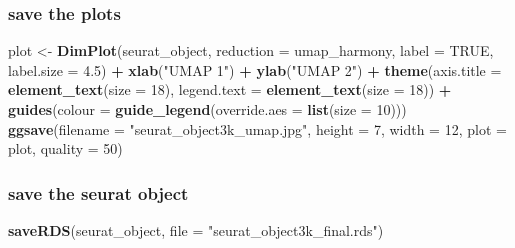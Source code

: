 \documentclass[
]{book}
\newenvironment{Shaded}{\begin{snugshade}}{\end{snugshade}}
\newcommand{\AttributeTok}[1]{\textcolor[rgb]{0.13,0.29,0.53}{#1}}
\newcommand{\ConstantTok}[1]{\textcolor[rgb]{0.56,0.35,0.01}{#1}}
\newcommand{\DecValTok}[1]{\textcolor[rgb]{0.00,0.00,0.81}{#1}}
\newcommand{\FloatTok}[1]{\textcolor[rgb]{0.00,0.00,0.81}{#1}}
\newcommand{\FunctionTok}[1]{\textcolor[rgb]{0.13,0.29,0.53}{\textbf{#1}}}
\newcommand{\NormalTok}[1]{#1}
\newcommand{\OtherTok}[1]{\textcolor[rgb]{0.56,0.35,0.01}{#1}}
\newcommand{\SpecialCharTok}[1]{\textcolor[rgb]{0.81,0.36,0.00}{\textbf{#1}}}
\newcommand{\StringTok}[1]{\textcolor[rgb]{0.31,0.60,0.02}{#1}}
\begin{document}
\subsubsection*{}\label{section-13}

\subsubsection{save the plots}\label{save-the-plots}

\begin{Shaded}
\begin{Highlighting}[]

\NormalTok{plot }\OtherTok{\textless{}{-}} \FunctionTok{DimPlot}\NormalTok{(seurat\_object, }\AttributeTok{reduction =} \StringTok{\textquotesingle{}umap\_harmony\textquotesingle{}}\NormalTok{, }\AttributeTok{label =} \ConstantTok{TRUE}\NormalTok{, }\AttributeTok{label.size =} \FloatTok{4.5}\NormalTok{) }\SpecialCharTok{+} \FunctionTok{xlab}\NormalTok{(}\StringTok{"UMAP 1"}\NormalTok{) }\SpecialCharTok{+} \FunctionTok{ylab}\NormalTok{(}\StringTok{"UMAP 2"}\NormalTok{) }\SpecialCharTok{+} 
  \FunctionTok{theme}\NormalTok{(}\AttributeTok{axis.title =} \FunctionTok{element\_text}\NormalTok{(}\AttributeTok{size =} \DecValTok{18}\NormalTok{), }\AttributeTok{legend.text =} \FunctionTok{element\_text}\NormalTok{(}\AttributeTok{size =} \DecValTok{18}\NormalTok{)) }\SpecialCharTok{+} 
  \FunctionTok{guides}\NormalTok{(}\AttributeTok{colour =} \FunctionTok{guide\_legend}\NormalTok{(}\AttributeTok{override.aes =} \FunctionTok{list}\NormalTok{(}\AttributeTok{size =} \DecValTok{10}\NormalTok{)))}
\FunctionTok{ggsave}\NormalTok{(}\AttributeTok{filename =} \StringTok{"seurat\_object3k\_umap.jpg"}\NormalTok{, }\AttributeTok{height =} \DecValTok{7}\NormalTok{, }\AttributeTok{width =} \DecValTok{12}\NormalTok{, }\AttributeTok{plot =}\NormalTok{ plot, }\AttributeTok{quality =} \DecValTok{50}\NormalTok{)}
\end{Highlighting}
\end{Shaded}

\subsubsection{save the seurat object}\label{save-the-seurat-object}

\begin{Shaded}
\begin{Highlighting}[]
\FunctionTok{saveRDS}\NormalTok{(seurat\_object, }\AttributeTok{file =} \StringTok{"seurat\_object3k\_final.rds"}\NormalTok{)}
\end{Highlighting}
\end{Shaded}
\end{document}

